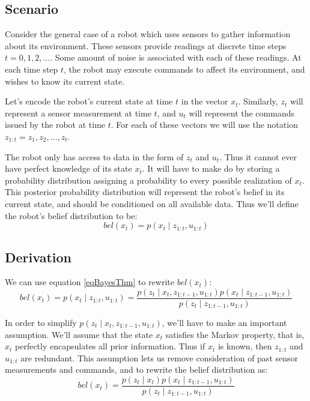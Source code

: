 \subsection{Scenario}
Consider the general case of a robot which uses sensors to gather information about its environment. These sensors provide readings at discrete time steps \(t=0,1,2,...\). Some amount of noise is associated with each of these readings. At each time step \(t\), the robot may execute commands to affect its environment, and wishes to know its current state.

Let's encode the robot's current state at time \(t\) in the vector \(x_t\). Similarly, \(z_t\) will represent a sensor measurement at time \(t\), and \(u_t\) will represent the commands issued by the robot at time \(t\). For each of these vectors we will use the notation \(z_{1:t} = z_1, z_2, ..., z_t\). 

The robot only has access to data in the form of \(z_t\) and \(u_t\). Thus it cannot ever have perfect knowledge of its state \(x_t\). It will have to make do by storing a probability distribution assigning a probability to every possible realization of \(x_t\). This posterior probability distribution will represent the robot's belief in its current state, and should be conditioned on all available data. Thus we'll define the robot's belief distribution to be:
\begin{equation} \label{eqBel}
bel(x_t) = p(x_t \mathbin{\vert} z_{1:t}, u_{1:t})
\end{equation}

\subsection{Derivation}

We can use equation \ref{eqBayesThm} to rewrite \(bel(x_t)\):
\begin{equation*}
bel(x_t) = p(x_t \mathbin{\vert} z_{1:t}, u_{1:t}) = \frac{p(z_t \mathbin{\vert} x_t, z_{1:t-1}, u_{1:t})p(x_t \mathbin{\vert} z_{1:t-1}, u_{1:t})}{p(z_t \mathbin{\vert} z_{1:t-1}, u_{1:t})}
\end{equation*}

In order to simplify \(p(z_t \mathbin{\vert} x_t, z_{1:t-1}, u_{1:t})\), we'll have to make an important assumption. We'll assume that the state \(x_t\) satisfies the Markov property, that is, \(x_t\) perfectly encapsulates all prior information. Thus if \(x_t\) is known, then \(z_{1:t}\) and \(u_{1:t}\) are redundant. This assumption lets us remove consideration of past sensor measurements and commands, and to rewrite the belief distribution as:
\begin{equation*}
bel(x_t) = \frac{p(z_t \mathbin{\vert} x_t)p(x_t \mathbin{\vert} z_{1:t-1}, u_{1:t})}{p(z_t \mathbin{\vert} z_{1:t-1}, u_{1:t})}
\end{equation*}

